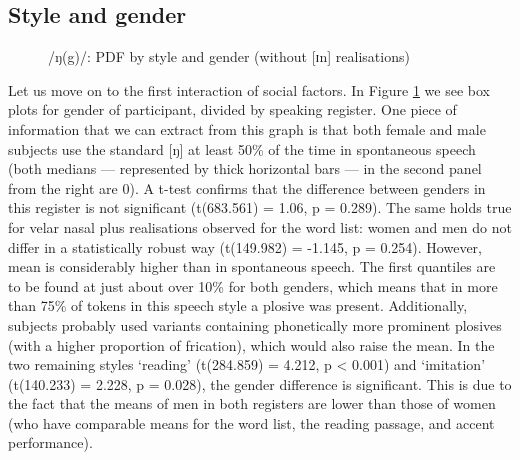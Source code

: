 \subsection{Style and gender}
\label{sec.prod.res.con.ng.stylegender}

\begin{figure}[h]
	\centering
		\resizebox{.49\linewidth}{!}{} 
	\caption{/ŋ(g)/: PDF by style and gender (without [ɪn] realisations)}
	\label{fig.box.ng.stylegender}
\end{figure}

Let us move on to the first interaction of social factors.
In Figure \ref{fig.box.ng.stylegender} we see box plots for gender of participant, divided by speaking register.
One piece of information that we can extract from this graph is that both female and male subjects use the standard [ŋ] at least 50\% of the time in spontaneous speech (both medians --- represented by thick horizontal bars --- in the second panel from the right are 0).
A t-test confirms that the difference between genders in this register is not significant (t(683.561) = 1.06, p = 0.289).
The same holds true for velar nasal plus realisations observed for the word list: women and men do not differ in a statistically robust way (t(149.982) = -1.145, p = 0.254).
However, mean  is considerably higher than in spontaneous speech.
The first quantiles are to be found at just about over 10\%  for both genders, which means that in more than 75\% of tokens in this speech style a plosive was present.
Additionally, subjects probably used variants containing phonetically more prominent plosives (with a higher proportion of frication), which would also raise the mean.
In the two remaining styles `reading' (t(284.859) = 4.212, p < 0.001) and `imitation' (t(140.233) = 2.228, p = 0.028), the gender difference is significant.
This is due to the fact that the means of men in both registers are lower than those of women (who have comparable means for the word list, the reading passage, and accent performance).

